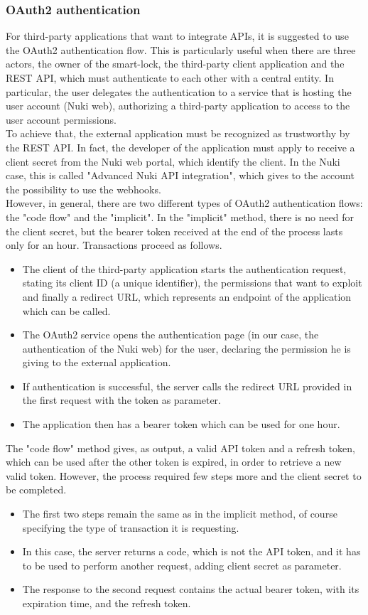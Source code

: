 \subsubsection{OAuth2 authentication}
For third-party applications that want to integrate APIs, it is suggested to use the OAuth2 authentication flow. This is particularly useful when there are three actors, the owner of the smart-lock, the third-party client application and the REST API, which must authenticate to each other with a central entity. In particular, the user delegates the authentication to a service that is hosting the user account (Nuki web), authorizing a third-party application to access to the user account permissions.
\\ To achieve that, the external application must be recognized as trustworthy by the REST API. In fact, the developer of the application must apply to receive a client secret from the Nuki web portal, which identify the client. In the Nuki case, this is called "Advanced Nuki API integration", which gives to the account the possibility to use the webhooks. 
\\ However, in general, there are two different types of OAuth2 authentication flows: the "code flow" and the "implicit". In the "implicit" method, there is no need for the client secret, but the bearer token received at the end of the process lasts only for an hour. Transactions proceed as follows.
\begin{itemize}
    \item The client of the third-party application starts the authentication request, stating its client ID (a unique identifier), the permissions that want to exploit and finally a redirect URL, which represents an endpoint of the application which can be called.
    \item The OAuth2 service opens the authentication page (in our case, the authentication of the Nuki web) for the user, declaring the permission he is giving to the external application.
    \item If authentication is successful, the server calls the redirect URL provided in the first request with the token as parameter.
    \item The application then has a bearer token which can be used for one hour.
\end{itemize}

The "code flow" method gives, as output, a valid API token and a refresh token, which can be used after the other token is expired, in order to retrieve a new valid token. However, the process required few steps more and the client secret to be completed.
\begin{itemize}
    \item The first two steps remain the same as in the implicit method, of course specifying the type of transaction it is requesting.
    \item In this case, the server returns a code, which is not the API token, and it has to be used to perform another request, adding client secret as parameter.
    \item The response to the second request contains the actual bearer token, with its expiration time, and the refresh token.
\end{itemize}
